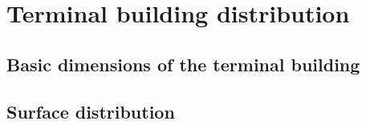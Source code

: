 \chapter{Terminal building distribution}

	\section{Basic dimensions of the terminal building}
	
	\section{Surface distribution}
	
	